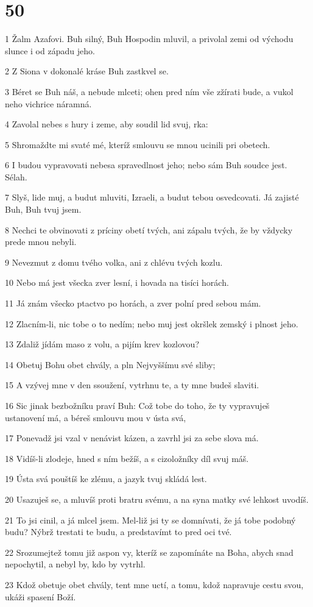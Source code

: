 \chapter{50}

\par 1 Žalm Azafovi. Buh silný, Buh Hospodin mluvil, a privolal zemi od východu slunce i od západu jeho.
\par 2 Z Siona v dokonalé kráse Buh zastkvel se.
\par 3 Béret se Buh náš, a nebude mlceti; ohen pred ním vše zžírati bude, a vukol neho vichrice náramná.
\par 4 Zavolal nebes s hury i zeme, aby soudil lid svuj, rka:
\par 5 Shromaždte mi svaté mé, kteríž smlouvu se mnou ucinili pri obetech.
\par 6 I budou vypravovati nebesa spravedlnost jeho; nebo sám Buh soudce jest. Sélah.
\par 7 Slyš, lide muj, a budut mluviti, Izraeli, a budut tebou osvedcovati. Já zajisté Buh, Buh tvuj jsem.
\par 8 Nechci te obvinovati z príciny obetí tvých, ani zápalu tvých, že by vždycky prede mnou nebyli.
\par 9 Nevezmut z domu tvého volka, ani z chlévu tvých kozlu.
\par 10 Nebo má jest všecka zver lesní, i hovada na tisíci horách.
\par 11 Já znám všecko ptactvo po horách, a zver polní pred sebou mám.
\par 12 Zlacním-li, nic tobe o to nedím; nebo muj jest okršlek zemský i plnost jeho.
\par 13 Zdaliž jídám maso z volu, a pijím krev kozlovou?
\par 14 Obetuj Bohu obet chvály, a pln Nejvyššímu své sliby;
\par 15 A vzývej mne v den ssoužení, vytrhnu te, a ty mne budeš slaviti.
\par 16 Sic jinak bezbožníku praví Buh: Což tobe do toho, že ty vypravuješ ustanovení má, a béreš smlouvu mou v ústa svá,
\par 17 Ponevadž jsi vzal v nenávist kázen, a zavrhl jsi za sebe slova má.
\par 18 Vidíš-li zlodeje, hned s ním bežíš, a s cizoložníky díl svuj máš.
\par 19 Ústa svá pouštíš ke zlému, a jazyk tvuj skládá lest.
\par 20 Usazuješ se, a mluvíš proti bratru svému, a na syna matky své lehkost uvodíš.
\par 21 To jsi cinil, a já mlcel jsem. Mel-liž jsi ty se domnívati, že já tobe podobný budu? Nýbrž trestati te budu, a predstavímt to pred oci tvé.
\par 22 Srozumejtež tomu již aspon vy, kteríž se zapomínáte na Boha, abych snad nepochytil, a nebyl by, kdo by vytrhl.
\par 23 Kdož obetuje obet chvály, tent mne uctí, a tomu, kdož napravuje cestu svou, ukáži spasení Boží.

